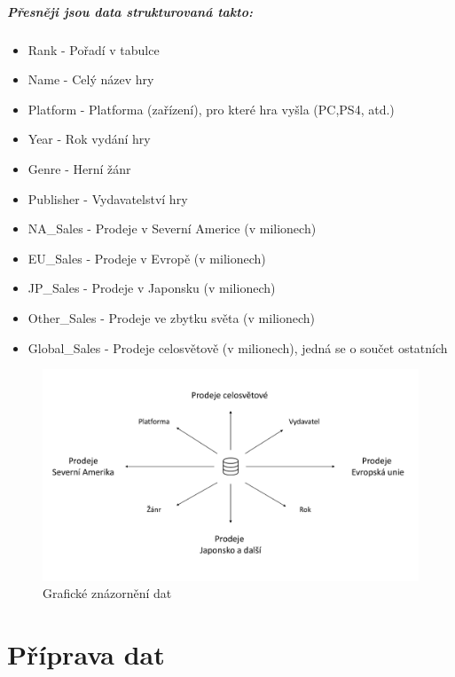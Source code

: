 \documentclass[FM,ZP]{tulthesis}
\begin{document}
\paragraph{Přesněji jsou data strukturovaná takto:}
\begin{itemize}
\item Rank - Pořadí v tabulce
\item Name - Celý název hry
\item Platform - Platforma (zařízení), pro které hra vyšla (PC,PS4, atd.)
\item Year - Rok vydání hry
\item Genre - Herní žánr
\item Publisher - Vydavatelství hry
\item NA\_Sales - Prodeje v Severní Americe (v milionech)
\item EU\_Sales - Prodeje v Evropě (v milionech)
\item JP\_Sales - Prodeje v Japonsku (v milionech)
\item Other\_Sales - Prodeje ve zbytku světa (v milionech)
\item Global\_Sales - Prodeje celosvětově (v milionech), jedná se o součet ostatních
\end{itemize} 

\begin{figure}[H]
\begin{center}
\includegraphics[width=\textwidth]{images/dataStructure.pdf}
\caption{Grafické znázornění dat}
\label{image}
\end{center}
\end{figure}

\chapter{Příprava dat}
\end{document}
